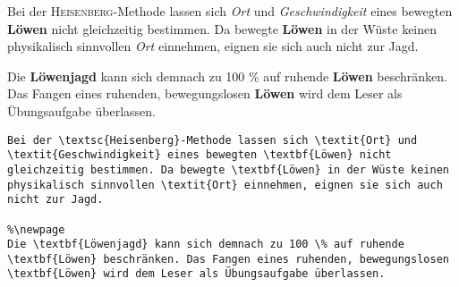\begin{frame}[fragile]
	\Losung
	\begin{outputbox}
		Bei der \textsc{Heisenberg}-Methode lassen sich \textit{Ort} und \textit{Geschwindigkeit} eines bewegten \textbf{Löwen} nicht gleichzeitig bestimmen. Da bewegte \textbf{Löwen} in der Wüste keinen physikalisch sinnvollen \textit{Ort} einnehmen, eignen sie sich auch nicht zur Jagd.
		
		Die \textbf{Löwenjagd} kann sich demnach zu 100 \% auf ruhende \textbf{Löwen} beschränken. Das Fangen eines ruhenden, bewegungslosen \textbf{Löwen} wird dem Leser als Übungsaufgabe überlassen.
	\end{outputbox}

	\Code
	\begin{lstlisting}
Bei der \textsc{Heisenberg}-Methode lassen sich \textit{Ort} und \textit{Geschwindigkeit} eines bewegten \textbf{Löwen} nicht gleichzeitig bestimmen. Da bewegte \textbf{Löwen} in der Wüste keinen physikalisch sinnvollen \textit{Ort} einnehmen, eignen sie sich auch nicht zur Jagd. 

%\newpage
Die \textbf{Löwenjagd} kann sich demnach zu 100 \% auf ruhende \textbf{Löwen} beschränken. Das Fangen eines ruhenden, bewegungslosen \textbf{Löwen} wird dem Leser als Übungsaufgabe überlassen.
	\end{lstlisting}
\end{frame}

